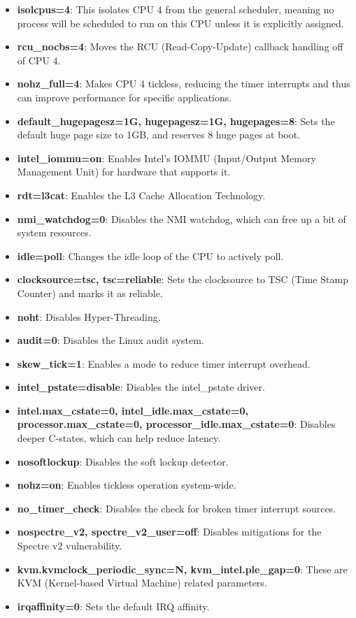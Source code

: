 \documentclass[MMR,Master,english]{twbook}
\begin{document}
\begin{itemize}
	\item \textbf{isolcpus=4}: This isolates CPU 4 from the general scheduler, meaning no process will be scheduled to run on this CPU unless it is explicitly assigned.
	\item \textbf{rcu\_nocbs=4}: Moves the RCU (Read-Copy-Update) callback handling off of CPU 4.
	\item \textbf{nohz\_full=4}: Makes CPU 4 tickless, reducing the timer interrupts and thus can improve performance for specific applications.
	\item \textbf{default\_hugepagesz=1G, hugepagesz=1G, hugepages=8}: Sets the default huge page size to 1GB, and reserves 8 huge pages at boot.
	\item \textbf{intel\_iommu=on}: Enables Intel's IOMMU (Input/Output Memory Management Unit) for hardware that supports it.
	\item \textbf{rdt=l3cat}: Enables the L3 Cache Allocation Technology.
	\item \textbf{nmi\_watchdog=0}: Disables the NMI watchdog, which can free up a bit of system resources.
	\item \textbf{idle=poll}: Changes the idle loop of the CPU to actively poll.
	\item \textbf{clocksource=tsc, tsc=reliable}: Sets the clocksource to TSC (Time Stamp Counter) and marks it as reliable.
	\item \textbf{noht}: Disables Hyper-Threading.
	\item \textbf{audit=0}: Disables the Linux audit system.
	\item \textbf{skew\_tick=1}: Enables a mode to reduce timer interrupt overhead.
	\item \textbf{intel\_pstate=disable}: Disables the intel\_pstate driver.
	\item \textbf{intel.max\_cstate=0, intel\_idle.max\_cstate=0, processor.max\_cstate=0, processor\_idle.max\_cstate=0}: Disables deeper C-states, which can help reduce latency.
	\item \textbf{nosoftlockup}: Disables the soft lockup detector.
	\item \textbf{nohz=on}: Enables tickless operation system-wide.
	\item \textbf{no\_timer\_check}: Disables the check for broken timer interrupt sources.
	\item \textbf{nospectre\_v2, spectre\_v2\_user=off}: Disables mitigations for the Spectre v2 vulnerability.
	\item \textbf{kvm.kvmclock\_periodic\_sync=N, kvm\_intel.ple\_gap=0}: These are KVM (Kernel-based Virtual Machine) related parameters.
	\item \textbf{irqaffinity=0}: Sets the default IRQ affinity.
\end{itemize}
\end{document}
